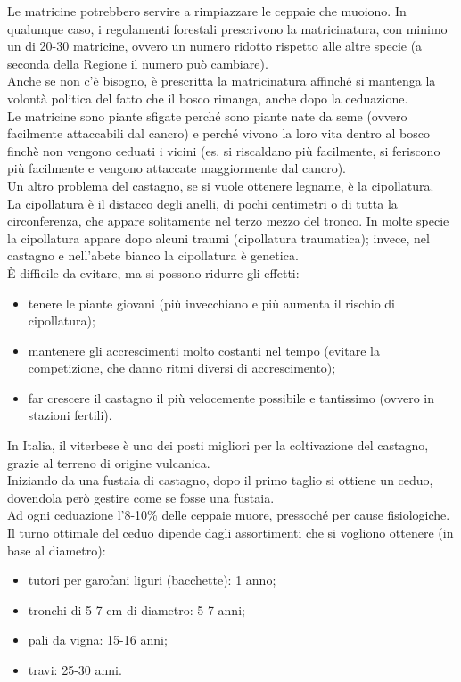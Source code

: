 Le matricine potrebbero servire a rimpiazzare le ceppaie che muoiono. In qualunque caso, i regolamenti forestali prescrivono la matricinatura, con minimo un di 20-30 matricine, ovvero un numero ridotto rispetto alle altre specie (a seconda della Regione il numero può cambiare).\\
Anche se non c'è bisogno, è prescritta la matricinatura affinché si mantenga la volontà politica del fatto che il bosco rimanga, anche dopo la ceduazione.\\
Le matricine sono piante sfigate perché sono piante nate da seme (ovvero facilmente attaccabili dal cancro) e perché vivono la loro vita dentro al bosco finchè non vengono ceduati i vicini (es. si riscaldano più facilmente, si feriscono più facilmente e vengono attaccate maggiormente dal cancro).\\
Un altro problema del castagno, se si vuole ottenere legname, è la cipollatura.\\
La cipollatura è il distacco degli anelli, di pochi centimetri o di tutta la circonferenza, che appare solitamente nel terzo mezzo del tronco. In molte specie la cipollatura appare dopo alcuni traumi (cipollatura traumatica); invece, nel castagno e nell'abete bianco la cipollatura è genetica.\\
È difficile da evitare, ma si possono ridurre gli effetti:
\begin{itemize}[nosep]
    \item tenere le piante giovani (più invecchiano e più aumenta il rischio di cipollatura);
    \item mantenere gli accrescimenti molto costanti nel tempo (evitare la competizione, che danno ritmi diversi di accrescimento);
    \item far crescere il castagno il più velocemente possibile e tantissimo (ovvero in stazioni fertili).
\end{itemize}
In Italia, il viterbese è uno dei posti migliori per la coltivazione del castagno, grazie al terreno di origine vulcanica.\\
Iniziando da una fustaia di castagno, dopo il primo taglio si ottiene un ceduo, dovendola però gestire come se fosse una fustaia.\\
Ad ogni ceduazione l'8-10\% delle ceppaie muore, pressoché per cause fisiologiche.\\
Il turno ottimale del ceduo dipende dagli assortimenti che si vogliono ottenere (in base al diametro):
\begin{itemize}[nosep]
    \item tutori per garofani liguri (bacchette): 1 anno;
    \item tronchi di 5-7 cm di diametro: 5-7 anni;
    \item pali da vigna: 15-16 anni;
    \item travi: 25-30 anni. 
\end{itemize}
